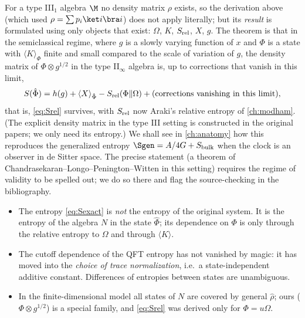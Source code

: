 For a type III$_1$ algebra $\M$ no density matrix $\rho$ exists, so the derivation above (which used $\rho=\sum p_i\ket i\bra i$) does not apply literally; but its \emph{result} is formulated using only objects that exist: $\Omega$, $K$, $S_{\rm rel}$, $X$, $g$. The theorem is that in the semiclassical regime, where $g$ is a slowly varying function of $x$ and $\Phi$ is a state with $\langle K\rangle_\Phi$ finite and small compared to the scale of variation of $g$, the density matrix of $\Phi\otimes g^{1/2}$ in the type II$_\infty$ algebra is, up to corrections that vanish in this limit,
\begin{equation}
S(\hat\Phi)=h(g)+\langle X\rangle_{\hat\Phi}-S_{\rm rel}(\Phi\|\Omega)+(\text{corrections vanishing in this limit}),
\end{equation}
that is, \eqref{eq:Srel} survives, with $S_{\rm rel}$ now Araki's relative entropy of \cref{ch:modham}. (The explicit density matrix in the type III setting is constructed in the original papers; we only need its entropy.) We shall see in \cref{ch:anatomy} how this reproduces the generalized entropy $\Sgen=A/4G+S_{\rm bulk}$ when the clock is an observer in de Sitter space. The precise statement (a theorem of Chandrasekaran--Longo--Penington--Witten in this setting) requires the regime of validity to be spelled out; we do so there and flag the source-checking in the bibliography.

\begin{whatwrong}
\begin{itemize}
\item The entropy \eqref{eq:Sexact} is \emph{not} the entropy of the original system. It is the entropy of the algebra $N$ in the state $\hat\Phi$; its dependence on $\Phi$ is only through the relative entropy to $\Omega$ and through $\langle K\rangle$.
\item The cutoff dependence of the QFT entropy has not vanished by magic: it has moved into the \emph{choice of trace normalization}, i.e.\ a state-independent additive constant. Differences of entropies between states are unambiguous.
\item In the finite-dimensional model all states of $N$ are covered by general $\hat\rho$; ours ($\Phi\otimes g^{1/2}$) is a special family, and \eqref{eq:Srel} was derived only for $\Phi=u\Omega$.
\end{itemize}
\end{whatwrong}

